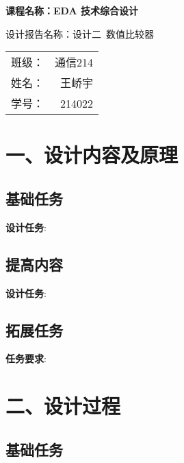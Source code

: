 \documentclass{article}
\newcommand{\fourhao}{\fontsize{14pt}{\baselineskip}\selectfont} %
\newcommand{\xiaosihao}{\fontsize{12pt}{\baselineskip}\selectfont} %
\begin{document}
\begin{titlepage}
    \centering
    \vspace*{2cm}

    \Huge
    \textbf{课程名称：EDA 技术综合设计}

    \vspace{2cm}

    \LARGE
    设计报告名称：设计二\ 数值比较器

    \vspace{4cm}

    \centering
    \Large
    \begin{tabular}{rl}
        班级： & 通信214    \\
        姓名： & \ 王峤宇    \\
        学号： & \ 214022
    \end{tabular}

    \vfill

    \vspace{1cm}
\end{titlepage}

\newpage
\section*{\fourhao 一、设计内容及原理}
\xiaosihao
{}
\subsection*{基础任务}
\textbf{设计任务}:
\subsection*{提高内容}
\textbf{设计任务}:
\subsection*{拓展任务}
\textbf{任务要求}:

\section*{\fourhao 二、设计过程}
\xiaosihao
{}
\subsection*{基础任务}
\end{document}
